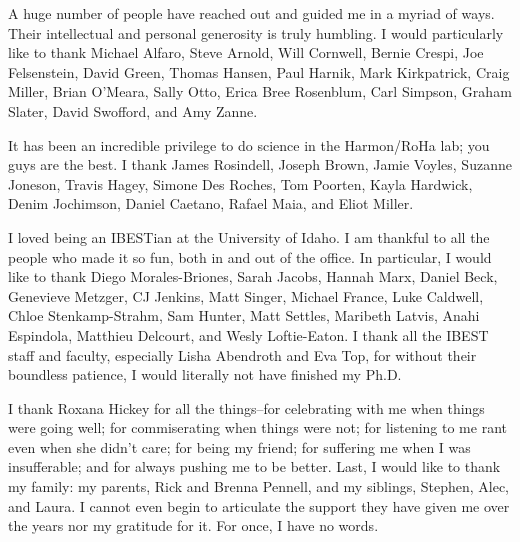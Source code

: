 A huge number of people have reached out and guided me in a myriad of ways. Their intellectual and personal generosity is truly humbling. I would particularly like to thank Michael Alfaro, Steve Arnold, Will Cornwell, Bernie Crespi, Joe Felsenstein, David Green, Thomas Hansen, Paul Harnik, Mark Kirkpatrick, Craig Miller, Brian O'Meara, Sally Otto, Erica Bree Rosenblum, Carl Simpson, Graham Slater, David Swofford, and Amy Zanne.

It has been an incredible privilege to do science in the Harmon/RoHa lab; you guys are the best. I thank James Rosindell, Joseph Brown, Jamie Voyles, Suzanne Joneson, Travis Hagey, Simone Des Roches, Tom Poorten, Kayla Hardwick, Denim Jochimson,  Daniel Caetano, Rafael Maia, and Eliot Miller.

I loved being an IBESTian at the University of Idaho. I am thankful to all the people who made it so fun, both in and out of the office. In particular, I would like to thank Diego Morales-Briones, Sarah Jacobs, Hannah Marx, Daniel Beck, Genevieve Metzger, CJ Jenkins, Matt Singer, Michael France, Luke Caldwell, Chloe Stenkamp-Strahm, Sam Hunter, Matt Settles, Maribeth Latvis, Anahi Espindola, Matthieu Delcourt, and Wesly Loftie-Eaton. I thank all the IBEST staff and faculty, especially Lisha Abendroth and Eva Top, for without their boundless patience, I would literally not have finished my Ph.D.

I thank Roxana Hickey for all the things--for celebrating with me when things were going well; for commiserating when things were not; for listening to me rant even when she didn't care; for being my friend; for suffering me when I was insufferable; and for always pushing me to be better. Last, I would like to thank my family: my parents, Rick and Brenna Pennell, and my siblings, Stephen, Alec, and Laura. I cannot even begin to articulate the support they have given me over the years nor my gratitude for it. For once, I have no words.


